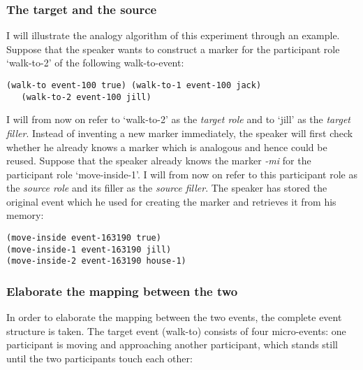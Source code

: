 \subsubsection{The target and the source}
 I will illustrate the analogy algorithm of this experiment through an example. Suppose that the speaker wants to construct a marker for the participant role `walk-to-2' of the following walk-to-event:

\ea
\begin{lstlisting}
(walk-to event-100 true) (walk-to-1 event-100 jack)
   (walk-to-2 event-100 jill)
\end{lstlisting}
\z

I will from now on refer to `walk-to-2' as the {\em target role} and to `jill' as the {\em target filler}. Instead of inventing a new marker immediately, the speaker will first check whether he already knows a marker which is analogous and hence could be reused. Suppose that the speaker already knows the marker {\em -mi} for the participant role `move-inside-1'. I will from now on refer to this participant role as the {\em source role} and its filler as the {\em source filler}. The speaker has stored the original event which he used for creating the marker and retrieves it from his memory:

\ea
\begin{lstlisting}
(move-inside event-163190 true) 
(move-inside-1 event-163190 jill)
(move-inside-2 event-163190 house-1)
\end{lstlisting}
\z

\subsubsection{Elaborate the mapping between the two}
 In order to elaborate the mapping between the two events, the complete event structure is taken. The target event (walk-to) consists of four micro-events: one participant is moving and approaching another participant, which stands still until the two participants touch each other:\\

